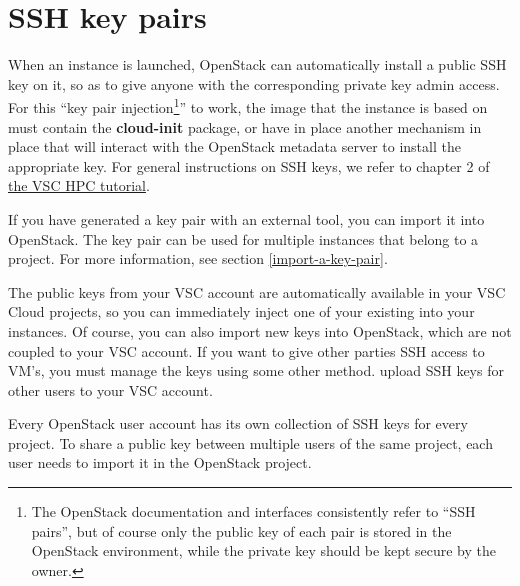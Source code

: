 \section{SSH key pairs}\label{sec:ssh-key-pairs}
When an instance is launched, OpenStack can automatically install a
public SSH key on it, so as to give anyone with the corresponding
private key admin access.  For this ``key pair injection\footnote{The
  OpenStack documentation and interfaces consistently refer to ``SSH
  pairs'', but of course only the public key of each pair is stored in
  the OpenStack environment, while the private key should be kept
  secure by the owner.}'' to work, the image that the instance is
based on must contain the \textbf{cloud-init} package, or have in
place another mechanism in place that will interact with the OpenStack
metadata server to install the appropriate key.  For general
instructions on SSH keys, we refer to chapter 2 of
\href{https://www.vscentrum.be/support/tut-book/vsc-tutorials}{the VSC
  HPC tutorial}.

If you have generated a key pair with an external tool, you can import
it into OpenStack. The key pair can be used for multiple instances
that belong to a project. For more information, see section
\ref{import-a-key-pair}.

 The public keys from your VSC account are automatically
available in your VSC Cloud projects, so you can immediately inject
one of your existing into your instances.  Of course, you can also
import new keys into OpenStack, which are not coupled to your VSC
account.  If you want to give other parties SSH access to VM's, you
must manage the keys using some other method.   upload
SSH keys for other users to your VSC account.

 Every OpenStack user account has its own collection of
SSH keys for every project.  To share a public key between multiple
users of the same project, each user needs to import it in the
OpenStack project.

